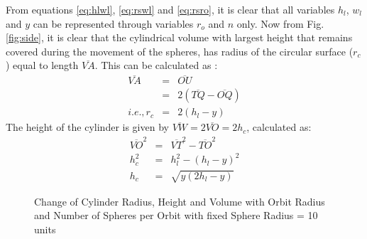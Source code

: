 \documentclass[10pt]{IEEEtran}
\begin{document}
From equations \ref{eq:hlwl}, \ref{eq:rswl} and \ref{eq:rsro}, it is clear that all variables $h_{l}$, $w_{l}$ and $y$ can be represented through variables $r_{o}$ and $n$ only. Now from Fig. \ref{fig:side}, it is clear that the cylindrical volume with largest height that remains covered during the movement of the spheres, has radius of the circular surface ($r_{c}$) equal to length $\overline{VA}$. This can be calculated as :
\begin{eqnarray}
\label{eq:rcy}
\overline{VA} & = & \overline{OU} \nonumber\\
& = & 2 (\overline{TQ} - \overline{OQ}) \nonumber\\
i.e., r_{c} & = & 2(h_{l}-y)
\end{eqnarray}
The height of the cylinder is given by $\overline{VW} = 2\overline{VO} = 2 h_{c}$, calculated as:
\begin{eqnarray}
\label{eq:hcy}
\overline{VO}^{2} & = & \overline{VT}^{2} - \overline{TO}^{2}\nonumber \\
h_{c}^{2} & = & h_{l}^{2} - (h_{l}-y)^{2} \nonumber\\
h_{c} & = & \sqrt{y(2h_{l}-y)}
\end{eqnarray}

\begin{figure*}[!t]
\centering
{}
\hfill
{}
\hfill
{}
\caption{Change of Cylinder Radius, Height and Volume with Orbit Radius and Number of Spheres per Orbit with fixed Sphere Radius = 10 units}
\label{fig:cylin}
\end{figure*}
\end{document}
